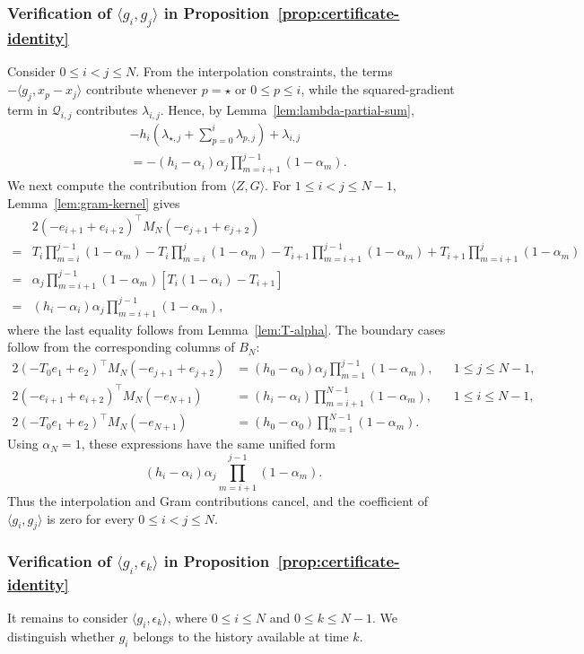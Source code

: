 \documentclass[11pt, hidelinks]{article}
\begin{document}
\subsubsection{Verification of $\langle g_i,g_j\rangle$ in Proposition~\ref{prop:certificate-identity}}
Consider $0\le i<j\le N$. From the interpolation constraints, the terms $-\langle g_j,x_p-x_j\rangle$ contribute whenever $p=\star$ or $0\le p\le i$, while the squared-gradient term in $\mathcal Q_{i,j}$ contributes $\lambda_{i,j}$. Hence, by Lemma~\ref{lem:lambda-partial-sum},
\[\begin{aligned}
&-h_i\left(\lambda_{\star,j}+\sum_{p=0}^{i}\lambda_{p,j}\right)+\lambda_{i,j}\\
&=-(h_i-\alpha_i)\alpha_j\prod_{m=i+1}^{j-1}(1-\alpha_m).
\end{aligned}\]
We next compute the contribution from $\langle Z,G\rangle$. For $1\le i<j\le N-1$, Lemma~\ref{lem:gram-kernel} gives
\[ \begin{aligned}
&2(-e_{i+1}+e_{i+2})^\top M_N(-e_{j+1}+e_{j+2})\\
={}&T_i\prod_{m=i}^{j-1}(1-\alpha_m)-T_i\prod_{m=i}^{j}(1-\alpha_m)
-T_{i+1}\prod_{m=i+1}^{j-1}(1-\alpha_m)+T_{i+1}\prod_{m=i+1}^{j}(1-\alpha_m)\\
={}&\alpha_j\prod_{m=i+1}^{j-1}(1-\alpha_m)\left[T_i(1-\alpha_i)-T_{i+1}\right]\\
={}&(h_i-\alpha_i)\alpha_j\prod_{m=i+1}^{j-1}(1-\alpha_m),
\end{aligned} \]
where the last equality follows from Lemma~\ref{lem:T-alpha}. The boundary cases follow from the corresponding columns of $B_N$:
\[ \begin{aligned}
2(-T_0e_1+e_2)^\top M_N(-e_{j+1}+e_{j+2})
&=(h_0-\alpha_0)\alpha_j\prod_{m=1}^{j-1}(1-\alpha_m), &&1\le j\le N-1,\\
2(-e_{i+1}+e_{i+2})^\top M_N(-e_{N+1})
&=(h_i-\alpha_i)\prod_{m=i+1}^{N-1}(1-\alpha_m), &&1\le i\le N-1,\\
2(-T_0e_1+e_2)^\top M_N(-e_{N+1})
&=(h_0-\alpha_0)\prod_{m=1}^{N-1}(1-\alpha_m).
\end{aligned} \]
Using $\alpha_N=1$, these expressions have the same unified form
\[ (h_i-\alpha_i)\alpha_j\prod_{m=i+1}^{j-1}(1-\alpha_m). \]
Thus the interpolation and Gram contributions cancel, and the coefficient of $\langle g_i,g_j\rangle$ is zero for every $0\le i<j\le N$.
\subsubsection{Verification of $\langle g_i,\epsilon_k\rangle$ in Proposition~\ref{prop:certificate-identity}}
It remains to consider $\langle g_i,\epsilon_k\rangle$, where $0\le i\le N$ and $0\le k\le N-1$. We distinguish whether $g_i$ belongs to the history available at time $k$.
\end{document}

